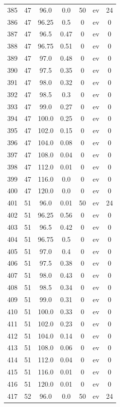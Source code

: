 \documentclass[12pt,a4paper]{article}
\begin{document}
\begin{tabular}{r|cccccc}
	385 & 47 & 96.0 & 0.0 & 50 & ev & 24 \\
	386 & 47 & 96.25 & 0.5 & 0 & ev & 0 \\
	387 & 47 & 96.5 & 0.47 & 0 & ev & 0 \\
	388 & 47 & 96.75 & 0.51 & 0 & ev & 0 \\
	389 & 47 & 97.0 & 0.48 & 0 & ev & 0 \\
	390 & 47 & 97.5 & 0.35 & 0 & ev & 0 \\
	391 & 47 & 98.0 & 0.32 & 0 & ev & 0 \\
	392 & 47 & 98.5 & 0.3 & 0 & ev & 0 \\
	393 & 47 & 99.0 & 0.27 & 0 & ev & 0 \\
	394 & 47 & 100.0 & 0.25 & 0 & ev & 0 \\
	395 & 47 & 102.0 & 0.15 & 0 & ev & 0 \\
	396 & 47 & 104.0 & 0.08 & 0 & ev & 0 \\
	397 & 47 & 108.0 & 0.04 & 0 & ev & 0 \\
	398 & 47 & 112.0 & 0.01 & 0 & ev & 0 \\
	399 & 47 & 116.0 & 0.0 & 0 & ev & 0 \\
	400 & 47 & 120.0 & 0.0 & 0 & ev & 0 \\
	401 & 51 & 96.0 & 0.01 & 50 & ev & 24 \\
	402 & 51 & 96.25 & 0.56 & 0 & ev & 0 \\
	403 & 51 & 96.5 & 0.42 & 0 & ev & 0 \\
	404 & 51 & 96.75 & 0.5 & 0 & ev & 0 \\
	405 & 51 & 97.0 & 0.4 & 0 & ev & 0 \\
	406 & 51 & 97.5 & 0.38 & 0 & ev & 0 \\
	407 & 51 & 98.0 & 0.43 & 0 & ev & 0 \\
	408 & 51 & 98.5 & 0.34 & 0 & ev & 0 \\
	409 & 51 & 99.0 & 0.31 & 0 & ev & 0 \\
	410 & 51 & 100.0 & 0.33 & 0 & ev & 0 \\
	411 & 51 & 102.0 & 0.23 & 0 & ev & 0 \\
	412 & 51 & 104.0 & 0.14 & 0 & ev & 0 \\
	413 & 51 & 108.0 & 0.06 & 0 & ev & 0 \\
	414 & 51 & 112.0 & 0.04 & 0 & ev & 0 \\
	415 & 51 & 116.0 & 0.01 & 0 & ev & 0 \\
	416 & 51 & 120.0 & 0.01 & 0 & ev & 0 \\
	417 & 52 & 96.0 & 0.0 & 50 & ev & 24 \\

\end{tabular}
\end{document}
